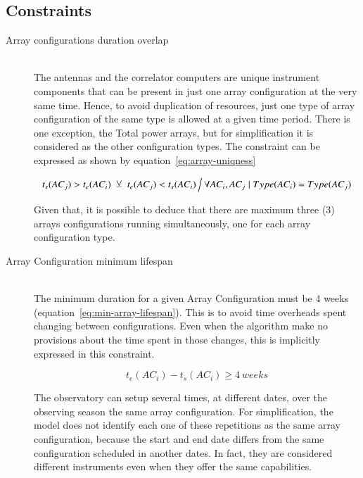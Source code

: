 \subsection{Constraints}
\begin{description}
\item[Array configurations duration overlap] \hfill \\
The antennas and the correlator computers are unique instrument components that can be present in just one array configuration at the very same time. Hence, to avoid duplication of resources, just one type of array configuration of the same type is allowed at a given time period. There is one exception, the Total power arrays, but for simplification it is considered as the other configuration types. The constraint can be expressed as shown by equation~\ref{eq:array-uniqness}

\begin{equation}
\label{eq:array-uniqness}
t_s(AC_j) > t_e(AC_i)\; \veebar \; t_e(AC_j) < t_s(AC_i) \:
\Big\slash \: \forall AC_i, AC_j \mid Type(AC_i) = Type(AC_j)
\end{equation}

Given that, it is possible to deduce that there are maximum three (3) arrays configurations running simultaneously, one for each array configuration type.

\item[Array Configuration minimum lifespan] \hfill \\
The minimum duration for a given Array Configuration must be 4 weeks (equation~\ref{eq:min-array-lifespan}). This is to avoid time overheads spent changing between configurations. Even when the algorithm make no provisions about the time spent in those changes, this is implicitly expressed in this constraint.

\begin{equation}
\label{eq:min-array-lifespan}
t_e(AC_i) - t_s(AC_i) \geq 4\:weeks
\end{equation}

The observatory can setup several times, at different dates, over the observing season the same array configuration. For simplification, the model does not identify each one of these repetitions as the same array configuration, because the start and end date differs from the same configuration scheduled in another dates. In fact, they are considered different instruments even when they offer the same capabilities.

\end{description}

